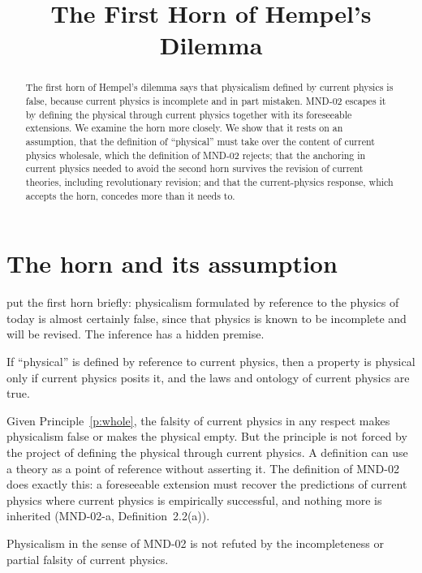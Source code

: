 \documentclass{situationist-preprint}
\title{The First Horn of Hempel's Dilemma}
\begin{document}
\maketitle

\begin{abstract}
The first horn of Hempel's dilemma says that physicalism defined by current physics is false, because current physics is incomplete and in part mistaken. MND-02 escapes it by defining the physical through current physics together with its foreseeable extensions. We examine the horn more closely. We show that it rests on an assumption, that the definition of \enquote{physical} must take over the content of current physics wholesale, which the definition of MND-02 rejects; that the anchoring in current physics needed to avoid the second horn survives the revision of current theories, including revolutionary revision; and that the current-physics response, which accepts the horn, concedes more than it needs to.
\end{abstract}

\section{The horn and its assumption}

\citet{Hempel1980} put the first horn briefly: physicalism formulated by reference to the physics of today is almost certainly false, since that physics is known to be incomplete and will be revised. The inference has a hidden premise.

\begin{principle}\label{p:whole}
If \enquote{physical} is defined by reference to current physics, then a property is physical only if current physics posits it, and the laws and ontology of current physics are true.
\end{principle}

Given Principle~\ref{p:whole}, the falsity of current physics in any respect makes physicalism false or makes the physical empty. But the principle is not forced by the project of defining the physical through current physics. A definition can use a theory as a point of reference without asserting it. The definition of MND-02 does exactly this: a foreseeable extension must recover the predictions of current physics where current physics is empirically successful, and nothing more is inherited (MND-02-a, Definition~2.2(a)).

\begin{proposition}\label{p:escape}
Physicalism in the sense of MND-02 is not refuted by the incompleteness or partial falsity of current physics.
\end{proposition}
\end{document}
